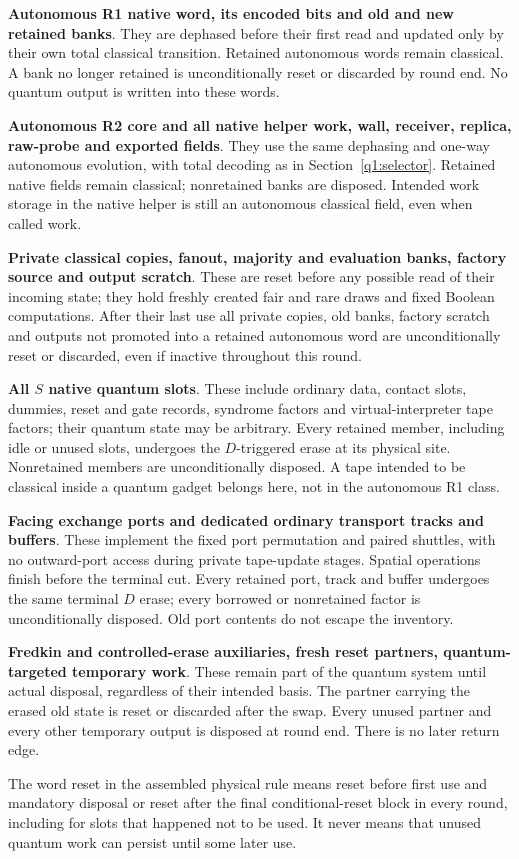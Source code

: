 \begin{lemma}
\noindent\textbf{Autonomous R1 native word, its encoded bits and old and new retained banks}. They are dephased before their first read and updated only by their own total classical transition. Retained autonomous words remain classical. A bank no longer retained is unconditionally reset or discarded by round end. No quantum output is written into these words.\par\smallskip
\noindent\textbf{Autonomous R2 core and all native helper work, wall, receiver, replica, raw-probe and exported fields}. They use the same dephasing and one-way autonomous evolution, with total decoding as in Section~\ref{q1:selector}. Retained native fields remain classical; nonretained banks are disposed. Intended work storage in the native helper is still an autonomous classical field, even when called work.\par\smallskip
\noindent\textbf{Private classical copies, fanout, majority and evaluation banks, factory source and output scratch}. These are reset before any possible read of their incoming state; they hold freshly created fair and rare draws and fixed Boolean computations. After their last use all private copies, old banks, factory scratch and outputs not promoted into a retained autonomous word are unconditionally reset or discarded, even if inactive throughout this round.\par\smallskip
\noindent\textbf{All \(S\) native quantum slots}. These include ordinary data, contact slots, dummies, reset and gate records, syndrome factors and virtual-interpreter tape factors; their quantum state may be arbitrary. Every retained member, including idle or unused slots, undergoes the \(D\)-triggered erase at its physical site. Nonretained members are unconditionally disposed. A tape intended to be classical inside a quantum gadget belongs here, not in the autonomous R1 class.\par\smallskip
\noindent\textbf{Facing exchange ports and dedicated ordinary transport tracks and buffers}. These implement the fixed port permutation and paired shuttles, with no outward-port access during private tape-update stages. Spatial operations finish before the terminal cut. Every retained port, track and buffer undergoes the same terminal \(D\) erase; every borrowed or nonretained factor is unconditionally disposed. Old port contents do not escape the inventory.\par\smallskip
\noindent\textbf{Fredkin and controlled-erase auxiliaries, fresh reset partners, quantum-targeted temporary work}. These remain part of the quantum system until actual disposal, regardless of their intended basis. The partner carrying the erased old state is reset or discarded after the swap. Every unused partner and every other temporary output is disposed at round end. There is no later return edge.\par\smallskip

The word reset in the assembled physical rule means reset before first use and mandatory disposal or reset after the final conditional-reset block in every round, including for slots that happened not to be used. It never means that unused quantum work can persist until some later use.

\end{lemma}
